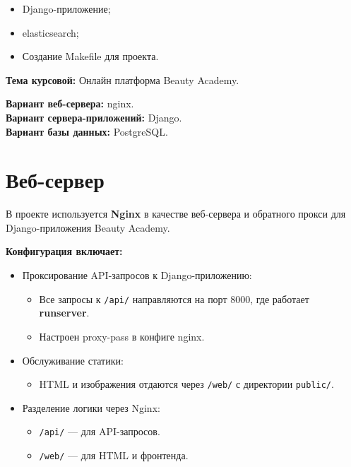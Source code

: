 \documentclass[a4paper,12pt]{article}
\begin{document}
\begin{itemize}[leftmargin=1.2cm]
\newpage  %
\begin{itemize}
    \item Django-приложение;
    \item elasticsearch;
    \item Создание Makefile для проекта.
\end{itemize}
\vspace{1.5\baselineskip}
\textbf{Тема курсовой:} Онлайн платформа Beauty Academy.

\textbf{Вариант веб-сервера:} nginx. \\
\textbf{Вариант сервера-приложений:} Django. \\
\textbf{Вариант базы данных:} PostgreSQL.

\newpage  %

\section{Веб-сервер}

В проекте используется \textbf{Nginx} в качестве веб-сервера и обратного прокси для Django-приложения Beauty Academy.

\textbf{Конфигурация включает:}

\begin{itemize}
    \item Проксирование API-запросов к Django-приложению:
    \begin{itemize}
        \item Все запросы к \texttt{/api/} направляются на порт 8000, где работает \textbf{runserver}.
        \item Настроен proxy-pass в конфиге nginx.
    \end{itemize}

    \item Обслуживание статики:
    \begin{itemize}
        \item HTML и изображения отдаются через \texttt{/web/} с директории \texttt{public/}.
    \end{itemize}

    \item Разделение логики через Nginx:
    \begin{itemize}
        \item \texttt{/api/} — для API-запросов.
        \item \texttt{/web/} — для HTML и фронтенда.
    \end{itemize}


\end{itemize}
\end{itemize}
\end{document}
